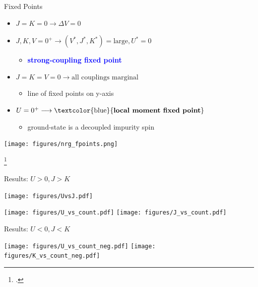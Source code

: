 \documentclass[aspectratio=169]{beamer}
\newcommand{\focus}[1]{\textcolor{blue}{\textbf{#1}}}
\newcommand{\cen}[1]{\begin{center}{#1}\end{center}}
\begin{document}
\begin{frame}{Fixed Points}
\begin{minipage}{0.6\textwidth}
	\begin{itemize}
		\item \(J=K=0 \longrightarrow \Delta V = 0\)
			\vspace*{20pt}
		\item \(J,K,V=0^+ \longrightarrow \left(V^*, J^*, K^*\right)=\text{large}, U^*=0\)
			\begin{itemize}
				\item \focus{strong-coupling fixed point}
			\end{itemize}
			\vspace*{20pt}
		\item \(J=K=V=0 \longrightarrow \text{all couplings marginal}\)
			\begin{itemize}
				\item line of fixed points on y-axis
			\end{itemize}
			\vspace*{20pt}
		\item \(U=0^+ \longrightarrow \text{\focus{local moment fixed point}}\)
			\begin{itemize}
				\item ground-state is a decoupled impurity spin
			\end{itemize}
	\end{itemize}
\end{minipage}
\begin{minipage}{0.38\textwidth}
	\centering
	\texttt{[image: figures/nrg\_fpoints.png]}
\end{minipage}
\footcite{haldane,Jefferson}
\end{frame}

\begin{frame}[noframenumbering]{Results: \(U>0, J>K\)}
\begin{minipage}{0.6\textwidth}
\cen{
	\texttt{[image: figures/UvsJ.pdf]}
}
\end{minipage}
\begin{minipage}{0.39\textwidth}
\cen{
	\texttt{[image: figures/U\_vs\_count.pdf]}
	\texttt{[image: figures/J\_vs\_count.pdf]}
}
\end{minipage}
\end{frame}


\begin{frame}[noframenumbering]{Results: \(U<0, J<K\)}
	\vspace*{30pt}
\cen{
	\texttt{[image: figures/U\_vs\_count\_neg.pdf]}
	\texttt{[image: figures/K\_vs\_count\_neg.pdf]}
}
\end{frame}
\end{document}
